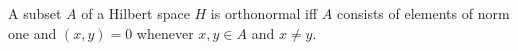 A subset $A$ of a Hilbert space $H$ is orthonormal iff $A$ consists of elements of norm one and $(x, y) = 0$ whenever $x, y \in A$ and $x \neq y$.
